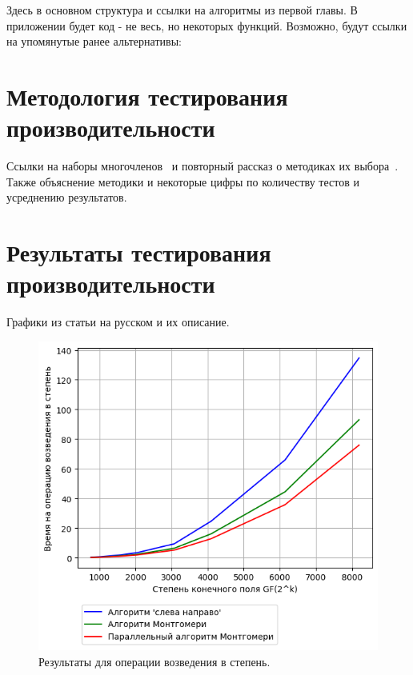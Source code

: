 \documentclass[times,specification,annotation]{itmo-student-thesis}
\begin{document}
Здесь в основном структура и ссылки на алгоритмы из первой главы.
В приложении будет код - не весь, но некоторых функций.
Возможно, будут ссылки на упомянутые ранее альтернативы:~\cite{pri16, mau15, jeo07}

\section{Методология тестирования производительности}\label{sec:meth}

Ссылки на наборы многочленов~\cite{rfc7296, rfc3526, par17} и повторный рассказ о методиках их выбора~\cite{rfc2412}.
Также объяснение методики и некоторые цифры по количеству тестов и усреднению результатов.

\section{Результаты тестирования производительности}\label{sec:results}

Графики из статьи на русском и их описание.
\begin{figure}
\caption{Результаты для операции возведения в степень.}\label{fig:res_bignum}
\includegraphics{graphics/results_bignum_ru.png}
\end{figure}
\end{document}

